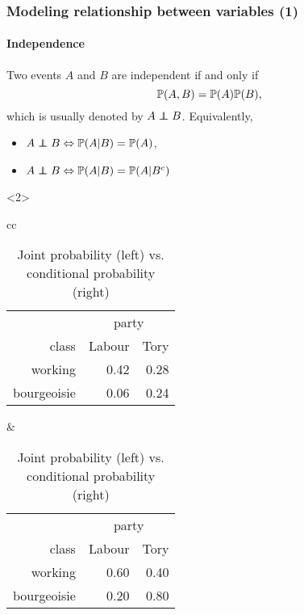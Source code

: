 \begin{frame}
  \frametitle{Modeling relationship between variables (1)}
  \framesubtitle{Independence}
  
  \begin{definition}
    Two events $A$ and $B$ are independent if and only if
    \begin{equation*}
      \mathbb{P}(A,B) = \mathbb{P}(A) \mathbb{P}(B),
    \end{equation*}
    which is usually denoted by $A \indep B$. Equivalently,
    \begin{itemize}
    \item $A \indep B \Leftrightarrow \prob(A | B) = \prob(A)$,
    \item $A \indep B \Leftrightarrow \prob(A | B) = \prob(A | B^c) $
    \end{itemize}
  \end{definition}

  \begin{example}<2>
    \begin{table}
      \centering
      \begin{tabular}{cc}
        \begin{tabular}{rrr}
        & \multicolumn{2}{c}{party} \\
        class & Labour & Tory \\ \hline
        working & 0.42 & 0.28 \\
        bourgeoisie & 0.06 & 0.24 \\
      \end{tabular} 
      & 
      \begin{tabular}{rrr}
        & \multicolumn{2}{c}{party} \\
        class & Labour & Tory \\ \hline
        working & 0.60 & 0.40 \\
        bourgeoisie & 0.20 & 0.80 \\
      \end{tabular} 
      \end{tabular} 
      \caption{Joint probability (left) vs. conditional probability (right)} 
    \end{table}
  \end{example}
\end{frame}


